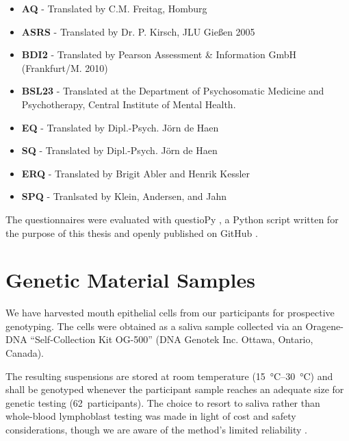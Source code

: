 	\begin{itemize}
	    \item \textbf{AQ} - Translated by C.M. Freitag, Homburg
	    \item \textbf{ASRS} - Translated by Dr. P. Kirsch, JLU Gießen 2005
	    \item \textbf{BDI2} - Translated by Pearson Assessment \& Information GmbH (Frankfurt/M. 2010)
	    \item \textbf{BSL23} - Translated at the Department of Psychosomatic Medicine and Psychotherapy, Central Institute of Mental Health.
	    \item \textbf{EQ} - Translated by Dipl.-Psych. Jörn de Haen
	    \item \textbf{SQ} - Translated by Dipl.-Psych. Jörn de Haen
	    \item \textbf{ERQ} - Translated by Brigit Abler and Henrik Kessler \citep{Abler2009}
	    \item \textbf{SPQ} - Tranlsated by Klein, Andersen, and Jahn \citep{Klein1997}
	\end{itemize}
	The questionnaires were evaluated with questioPy \citep{questiopy}, a Python script written for the purpose of this thesis and openly published on GitHub \citep{github}.
    \section{Genetic Material Samples}\label{sec:m_gms}
	We have harvested mouth epithelial cells from our participants for prospective genotyping.
	The cells were obtained as a saliva sample collected via an Oragene\textsuperscript{\small\textregistered}-DNA “Self-Collection Kit OG-500” (DNA Genotek Inc. Ottawa, Ontario, Canada).
	
	The resulting suspensions are stored at room temperature (\SIrange{15}{30}{\celsius}) and shall be genotyped whenever the participant sample reaches an adequate size for genetic testing (\SI{62}{participants}).
	The choice to resort to saliva rather than whole-blood lymphoblast testing was made in light of cost and safety considerations, though we are aware of the method's limited reliability \citep{Philibert2008}.
